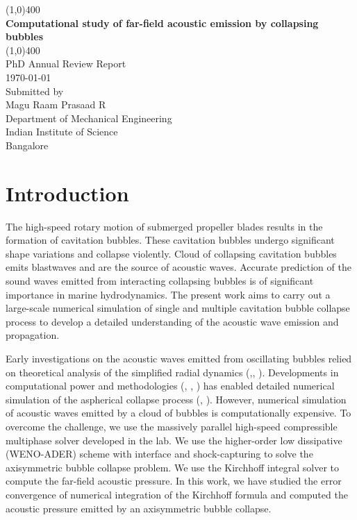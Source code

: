 \documentclass[12pt]{article}
\begin{document}
\begin{titlepage}
	\begin{center}

		\line(1,0){400}\\
		\huge{\bfseries Computational study of far-field acoustic emission by collapsing bubbles}\\
		\line(1,0){400}\\
		[3.5cm]
		{PhD Annual Review Report}\\
		{\today} \\
		[4cm]
		Submitted by\\
		[.5cm]
		{Magu Raam Prasaad R}\\
		[2.cm]
		Department of Mechanical Engineering\\
		Indian Institute of Science\\
		Bangalore

	\end{center}
\end{titlepage}
\section{Introduction}
The high-speed rotary motion of submerged propeller blades results in the formation of cavitation bubbles. These cavitation bubbles undergo significant shape variations and collapse violently. Cloud of collapsing cavitation bubbles emits blastwaves and are the source of acoustic waves.
Accurate prediction of the sound waves emitted from interacting collapsing bubbles is of significant importance in marine hydrodynamics.
The present work aims to carry out a large-scale numerical simulation of single and multiple cavitation bubble collapse process to develop a detailed understanding of the acoustic wave emission and propagation.

Early investigations on the acoustic waves emitted from oscillating bubbles relied on theoretical analysis of the simplified radial dynamics (\cite{Rayleigh},\cite{Plesset}, \cite{Prosperetti}). Developments in computational power and methodologies (\cite{SHUKLA20107411}, \cite{SHUKLA2014508}, \cite{Pantano}) has enabled detailed numerical simulation of the aspherical collapse process (\cite{freund2009shock}, \cite{jamaluddin}). However,
numerical simulation of acoustic waves emitted by a cloud of bubbles is computationally expensive. To overcome the challenge, we use the massively parallel high-speed compressible multiphase solver developed in the lab. We use the higher-order low dissipative (WENO-ADER) scheme with interface and shock-capturing to solve the axisymmetric bubble collapse problem. We use the Kirchhoff integral solver to compute the far-field acoustic pressure. In this work, we have studied the error convergence of numerical integration of the Kirchhoff formula and computed the acoustic pressure emitted by an axisymmetric bubble collapse. 
\end{document}
